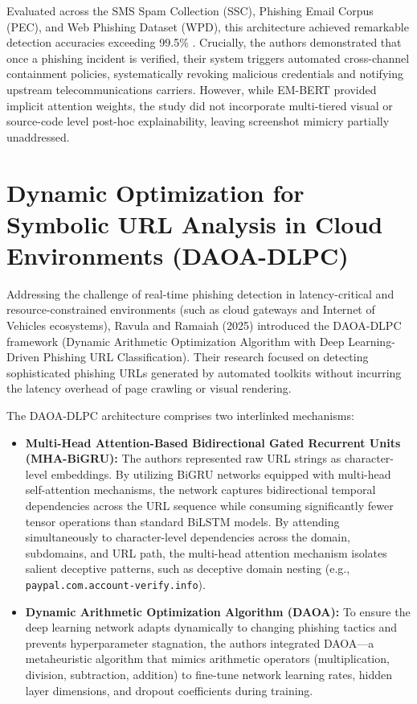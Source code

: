 Evaluated across the SMS Spam Collection (SSC), Phishing Email Corpus (PEC), and Web Phishing Dataset (WPD), this architecture achieved remarkable detection accuracies exceeding 99.5\% \cite{2}. Crucially, the authors demonstrated that once a phishing incident is verified, their system triggers automated cross-channel containment policies, systematically revoking malicious credentials and notifying upstream telecommunications carriers. However, while EM-BERT provided implicit attention weights, the study did not incorporate multi-tiered visual or source-code level post-hoc explainability, leaving screenshot mimicry partially unaddressed.

\section{Dynamic Optimization for Symbolic URL Analysis in Cloud Environments (DAOA-DLPC)}
Addressing the challenge of real-time phishing detection in latency-critical and resource-constrained environments (such as cloud gateways and Internet of Vehicles ecosystems), Ravula and Ramaiah (2025) \cite{3} introduced the DAOA-DLPC framework (Dynamic Arithmetic Optimization Algorithm with Deep Learning-Driven Phishing URL Classification). Their research focused on detecting sophisticated phishing URLs generated by automated toolkits without incurring the latency overhead of page crawling or visual rendering.

The DAOA-DLPC architecture comprises two interlinked mechanisms:
\begin{itemize}
\item \textbf{Multi-Head Attention-Based Bidirectional Gated Recurrent Units (MHA-BiGRU):} The authors represented raw URL strings as character-level embeddings. By utilizing BiGRU networks equipped with multi-head self-attention mechanisms, the network captures bidirectional temporal dependencies across the URL sequence while consuming significantly fewer tensor operations than standard BiLSTM models. By attending simultaneously to character-level dependencies across the domain, subdomains, and URL path, the multi-head attention mechanism isolates salient deceptive patterns, such as deceptive domain nesting (e.g., \texttt{paypal.com.account-verify.info}).
\item \textbf{Dynamic Arithmetic Optimization Algorithm (DAOA):} To ensure the deep learning network adapts dynamically to changing phishing tactics and prevents hyperparameter stagnation, the authors integrated DAOA---a metaheuristic algorithm that mimics arithmetic operators (multiplication, division, subtraction, addition) to fine-tune network learning rates, hidden layer dimensions, and dropout coefficients during training.
\end{itemize}

